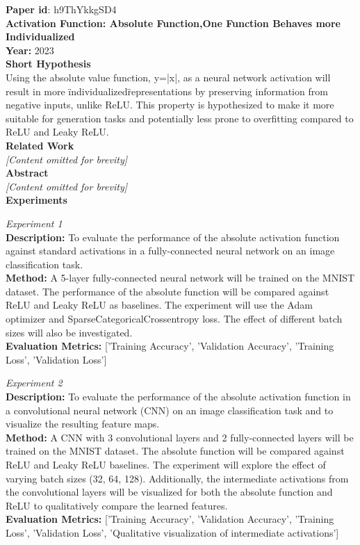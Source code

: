 \begin{tcolorbox}[title=\textbf{Example: Low-Soundness Proposal}]
\small
\raggedright

\textbf{Paper id}: h9ThYkkgSD4 \\

\textbf{Activation Function: Absolute Function,One Function Behaves more Individualized} \\

\textbf{Year:} 2023 \\

\textbf{Short Hypothesis} \\
Using the absolute value function, y=|x|, as a neural network activation will result in more \"individualized\" representations by preserving information from negative inputs, unlike ReLU. This property is hypothesized to make it more suitable for generation tasks and potentially less prone to overfitting compared to ReLU and Leaky ReLU.\\

\textbf{Related Work} \\
\textit{[Content omitted for brevity]} \\

\textbf{Abstract} \\
\textit{[Content omitted for brevity]} \\

\textbf{Experiments}

\textit{Experiment 1} \\
\textbf{Description:} To evaluate the performance of the absolute activation function against standard activations in a fully-connected neural network on an image classification task.\\
\textbf{Method:} A 5-layer fully-connected neural network will be trained on the MNIST dataset. The performance of the absolute function will be compared against ReLU and Leaky ReLU as baselines. The experiment will use the Adam optimizer and SparseCategoricalCrossentropy loss. The effect of different batch sizes will also be investigated. \\
\textbf{Evaluation Metrics:} ['Training Accuracy', 'Validation Accuracy', 'Training Loss', 'Validation Loss']

\vspace{0.5em}
\textit{Experiment 2} \\
\textbf{Description:} To evaluate the performance of the absolute activation function in a convolutional neural network (CNN) on an image classification task and to visualize the resulting feature maps. \\
\textbf{Method:} A CNN with 3 convolutional layers and 2 fully-connected layers will be trained on the MNIST dataset. The absolute function will be compared against ReLU and Leaky ReLU baselines. The experiment will explore the effect of varying batch sizes (32, 64, 128). Additionally, the intermediate activations from the convolutional layers will be visualized for both the absolute function and ReLU to qualitatively compare the learned features. \\
\textbf{Evaluation Metrics:} ['Training Accuracy', 'Validation Accuracy', 'Training Loss', 'Validation Loss', 'Qualitative visualization of intermediate activations'] 


\end{tcolorbox}
